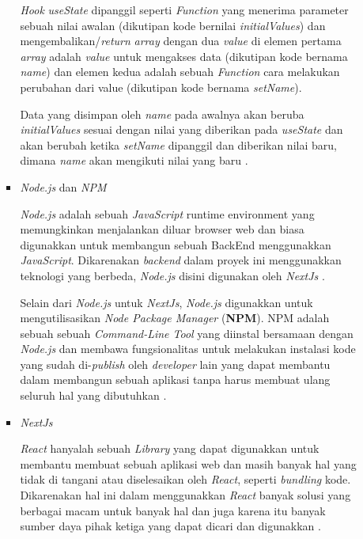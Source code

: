 \documentclass[a4paper]{article}
\begin{document}
\begin{enumerate}[label=\alph*. ]
\begin{enumerate}
\begin{itemize}
                        \textit{Hook} \textit{useState} dipanggil seperti \textit{Function} yang menerima parameter sebuah nilai awalan (dikutipan kode bernilai \textit{initialValues}) dan mengembalikan/\textit{return} \textit{array} dengan dua \textit{value} di elemen pertama \textit{array} adalah \textit{value} untuk mengakses data (dikutipan kode bernama \textit{name}) dan elemen kedua adalah sebuah \textit{Function} cara melakukan perubahan dari value (dikutipan kode bernama \textit{setName}).

                        Data yang disimpan oleh \textit{name} pada awalnya akan beruba \textit{initialValues} sesuai dengan nilai yang diberikan pada \textit{useState} dan akan berubah ketika \textit{setName} dipanggil dan diberikan nilai baru, dimana \textit{name} akan mengikuti nilai yang baru \autocite{React_useState}.

                        \item \textit{Node.js} dan \textit{NPM}

                        \textit{Node.js} adalah sebuah \textit{JavaScript} runtime environment yang memungkinkan menjalankan diluar browser web dan biasa digunakkan untuk membangun sebuah BackEnd menggunakkan \textit{JavaScript}. Dikarenakan \textit{backend} dalam proyek ini menggunakkan teknologi yang berbeda, \textit{Node.js} disini digunakan oleh \textit{NextJs} \autocite{Nextjs_use_webpack}.

	                    Selain dari \textit{Node.js} untuk \textit{NextJs}, \textit{Node.js} digunakkan untuk mengutilisasikan \textit{Node Package Manager} (\textbf{NPM}). NPM adalah sebuah sebuah \textit{Command-Line Tool} yang diinstal bersamaan dengan \textit{Node.js} dan membawa fungsionalitas untuk melakukan instalasi kode yang sudah di-\textit{publish} oleh \textit{developer} lain yang dapat membantu dalam membangun sebuah aplikasi tanpa harus membuat ulang seluruh hal yang dibutuhkan \autocite{Banks_Porcello_2020_npm}.

                        \item \textit{NextJs}

                        \textit{React} hanyalah sebuah \textit{Library} yang dapat digunakkan untuk membantu membuat sebuah aplikasi web dan masih banyak hal yang tidak di tangani atau diselesaikan oleh \textit{React}, seperti \textit{bundling} kode. Dikarenakan hal ini dalam menggunakkan \textit{React} banyak solusi yang berbagai macam untuk banyak hal dan juga karena itu banyak sumber daya pihak ketiga yang dapat dicari dan digunakkan \autocite{Nextjs_general}.


\end{itemize}
\end{enumerate}
\end{enumerate}
\end{document}
